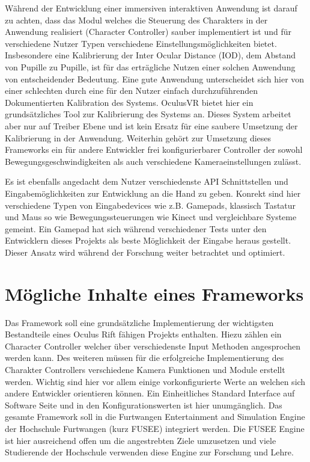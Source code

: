\documentclass[pagesize, paper=a4, fontsize=12pt,titlepage=true, headings=small, headnosepline, abstractoff, liststotoc, nochapterprefix, plainheadsepline]{scrreprt}
\begin{document}
Während der Entwicklung einer immersiven interaktiven Anwendung ist darauf zu achten, dass das Modul welches die Steuerung des Charakters in der Anwendung realisiert (Character Controller) sauber implementiert ist und für verschiedene Nutzer Typen verschiedene Einstellungsmöglichkeiten bietet. Insbesondere eine Kalibrierung der Inter Ocular Distance (IOD), dem Abstand von Pupille zu Pupille, ist für das erträgliche Nutzen einer solchen Anwendung von entscheidender Bedeutung. Eine gute Anwendung unterscheidet sich hier von einer schlechten durch eine für den Nutzer einfach durchzuführenden Dokumentierten Kalibration des Systems. OculusVR bietet hier ein grundsätzliches Tool zur Kalibrierung des Systems an. Dieses System arbeitet aber nur auf Treiber Ebene und ist kein Ersatz für eine saubere Umsetzung der Kalibrierung in der Anwendung.
Weiterhin gehört zur Umsetzung dieses Frameworks ein für andere Entwickler frei konfigurierbarer Controller der sowohl Bewegungsgeschwindigkeiten als auch verschiedene Kameraeinstellungen zulässt.

Es ist ebenfalls angedacht dem Nutzer verschiedenste API Schnittstellen und Eingabemöglichkeiten zur Entwicklung an die Hand zu geben. Konrekt sind hier verschiedene Typen von Eingabedevices wie z.B. Gamepads, klassisch Tastatur und Maus so wie Bewegungssteuerungen wie Kinect und vergleichbare Systeme gemeint. Ein Gamepad hat sich während verschiedener Tests unter den Entwicklern dieses Projekts als beste Möglichkeit der Eingabe heraus gestellt. Dieser Ansatz wird während der Forschung weiter betrachtet und optimiert.


\section{Mögliche Inhalte eines Frameworks}
Das Framework soll eine grundsätzliche Implementierung der wichtigsten Bestandteile eines Oculus Rift fähigen Projekts enthalten. Hiezu zählen ein Character Controller welcher über verschiedenste Input Methoden angesprochen werden kann. Des weiteren müssen für die erfolgreiche Implementierung des Charakter Controllers verschiedene Kamera Funktionen und Module erstellt werden. Wichtig sind hier vor allem einige vorkonfigurierte Werte an welchen sich andere Entwickler orientieren können. Ein Einheitliches Standard Interface auf Software Seite und in den Konfigurationswerten ist hier unumgänglich. Das gesamte Framework soll in die Furtwangen Entertainment and Simulation Engine der Hochschule Furtwangen (kurz FUSEE) integriert werden. Die FUSEE Engine ist hier ausreichend offen um die angestrebten Ziele umzusetzen und viele Studierende der Hochschule verwenden diese Engine zur Forschung und Lehre.
\end{document}
